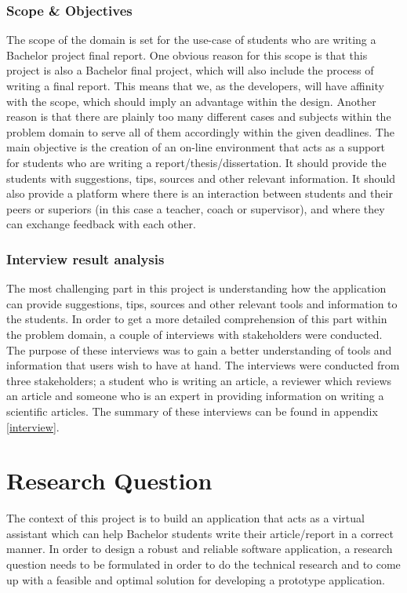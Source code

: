 \subsubsection{Scope \& Objectives}

The scope of the domain is set for the use-case of students who are writing a Bachelor project final report. One obvious reason for this scope is that this project is also a Bachelor final project, which will also include the process of writing a final report. This means that we, as the developers, will have affinity with the scope, which should imply an advantage within the design. Another reason is that there are plainly too many different cases and subjects within the problem domain to serve all of them accordingly within the given deadlines.
The main objective is the creation of an on-line environment that acts as a support for students who are writing a report/thesis/dissertation. It should provide the students with suggestions, tips, sources and other relevant information. It should also provide a platform where there is an interaction between students and their peers or superiors (in this case a teacher, coach or supervisor), and where they can exchange feedback with each other.

\subsubsection{Interview result analysis} %

The most challenging part in this project is understanding how the application can provide suggestions, tips, sources and other relevant tools and information to the students. In order to get a more detailed comprehension of this part within the problem domain, a couple of interviews with stakeholders were conducted. The purpose of these interviews was to gain a better understanding of tools and information that users wish to have at hand. The interviews were conducted from three stakeholders; a student who is writing an article, a reviewer which reviews an article and someone who is an expert in providing information on writing a scientific articles. The summary of these interviews can be found in appendix \ref{interview}.

\section{Research Question}

The context of this project is to build an application that acts as a virtual assistant which can help Bachelor students write their article/report in a correct manner. In order to design a robust and reliable software application, a research question needs to be formulated in order to do the technical research and to come up with a feasible and optimal solution for developing a prototype application.\\\\

